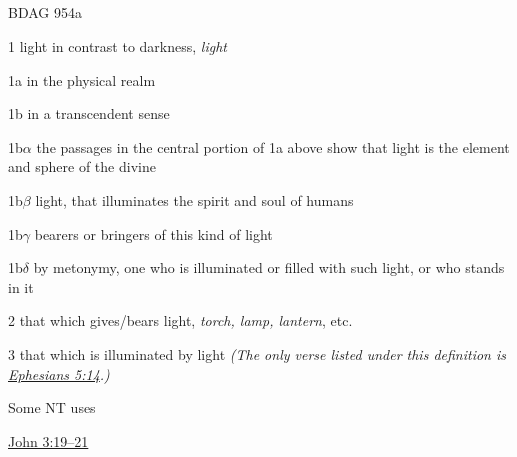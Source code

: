		
			\subparagraph{\texorpdfstring{}{}}
				\label{PHOS}
			
				\begin{compactdesc}
					\item[BDAG 954a] \textbf{}
						\begin{compactitem}
							\item[1] light in contrast to darkness, \textit{light}
							\item[1a] in the physical realm
							\item[1b] in a transcendent sense
							\item[1b$\alpha$] the passages in the central portion of 1a above show that light is the element and sphere of the divine
							\item[1b$\beta$] light, that illuminates the spirit and soul of humans
							\item[1b$\gamma$] bearers or bringers of this kind of light
							\item[1b$\delta$] by metonymy, one who is illuminated or filled with such light, or who stands in it
							\item[2] that which gives/bears light, \textit{torch, lamp, lantern}, etc.
							\item[3] that which is illuminated by light \textit{(The only verse listed under this definition is \hyperref[EPHESIANS-5-14]{Ephesians 5:14}.)}
						\end{compactitem}
				\end{compactdesc}
				
				\begin{compactdesc}
					\item[Some NT uses] \textbf{}
						\begin{compactdesc}
							\item[{\hyperref[JOHN-3-19]{John 3:19--21}}]
						\end{compactdesc}
				\end{compactdesc}
				
